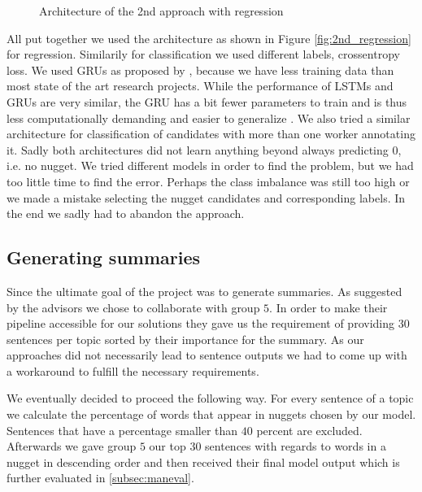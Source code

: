 \documentclass{article}
\begin{document}
\begin{figure}
\caption{Architecture of the 2nd approach with regression}
\end{figure}

All put together we used the architecture as shown in Figure \ref{fig:2nd_regression} for regression. Similarily for classification we used different labels,  crossentropy loss.
We used GRUs as proposed by \cite{gru2014}, because we have less training data than most state of the art research projects. While the performance of LSTMs and GRUs are very similar, the GRU has a bit fewer parameters to train and is thus less computationally demanding and easier to generalize \cite{cnn_rnn_comparative2017}. We also tried a similar architecture for classification of candidates with more than one worker annotating it. Sadly both architectures did not learn anything beyond always predicting 0, i.e. no nugget. We tried different models in order to find the problem, but we had too little time to find the error. Perhaps the class imbalance was still too high or we made a mistake selecting the nugget candidates and corresponding labels. In the end we sadly had to abandon the approach.


\subsection{Generating summaries}
Since the ultimate goal of the project was to generate summaries. As suggested by the advisors we chose to collaborate with group $5$. In order to make their pipeline accessible for our solutions they gave us the requirement of providing 30 sentences per topic sorted by their importance for the summary. As our approaches did not necessarily lead to sentence outputs we had to come up with a workaround to fulfill the necessary requirements.  

We eventually decided to proceed the following way. For every sentence of a topic we calculate the percentage of words that appear in nuggets chosen by our model. Sentences that have a percentage smaller than $40$ percent are excluded. Afterwards we gave group $5$ our top $30$ sentences with regards to words in a nugget in descending order and then received their final model output which is further evaluated in \ref{subsec:maneval}.   
\end{document}
